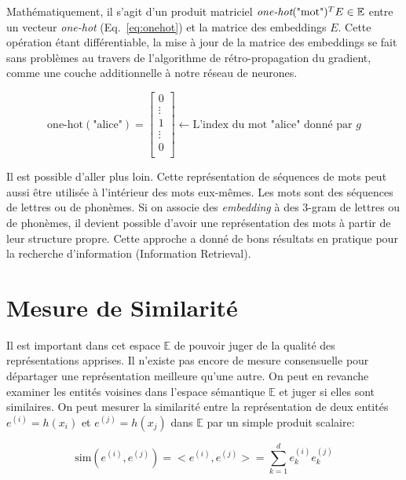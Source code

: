 Mathématiquement, il s'agit d'un produit matriciel
$\textrm{\it one-hot}(\textrm{"mot"})^{T}E\in\mathbb{E}$ entre un vecteur {\it one-hot}
(Eq.~\ref{eq:onehot}) et la matrice des embeddings $E$. Cette opération étant
différentiable, la mise à jour de la matrice des embeddings se fait sans
problèmes au travers de l'algorithme de rétro-propagation du gradient, comme
une couche additionnelle à notre réseau de neurones.

\begin{equation}
\label{eq:onehot}
\textrm{one-hot}(\textrm{"alice"}) =
\begin{bmatrix}
0\\
\vdots\\
1\\
\vdots\\
0\\
\end{bmatrix} 
\leftarrow \textrm{L'index du mot "alice" donné par $g$}
\end{equation}


Il est possible d'aller plus loin. Cette représentation de séquences de mots
peut aussi être utilisée à l'intérieur des mots eux-mêmes. Les mots sont des
séquences de lettres ou de phonèmes. Si on associe des {\it embedding} à des
3-gram de lettres ou de phonèmes, il devient possible d'avoir une
représentation des mots à partir de leur structure propre.  Cette approche
\citep{rnn58} a donné de bons résultats en pratique pour la recherche
d'information (Information Retrieval).

\section{Mesure de Similarité}

Il est important dans cet espace $\mathbb{E}$ de pouvoir juger de la qualité des
représentations apprises. Il n'existe pas encore de mesure consensuelle pour départager une
représentation meilleure qu'une autre. On peut en revanche examiner les entités
voisines dans l'espace sémantique $\mathbb{E}$ et juger si elles sont
similaires. On peut mesurer la similarité entre la représentation de deux entités $e^{(i)}=h(x_i)$ et
$e^{(j)}=h(x_j)$ dans $\mathbb{E}$ par un simple produit scalaire:

\begin{equation}
\label{eq:dot-simple}
\textrm{sim}(e^{(i)}, e^{(j)})=<e^{(i)}, e^{(j)}> = \sum_{k=1}^{d}e^{(i)}_k e^{(j)}_k
\end{equation}


